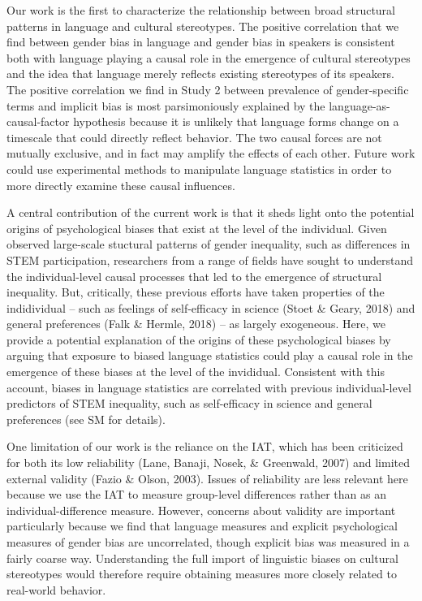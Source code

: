 \documentclass[man,floatsintext]{apa6}
\begin{document}
Our work is the first to characterize the relationship between broad structural patterns in language and cultural stereotypes. The positive correlation that we find between gender bias in language and gender bias in speakers is consistent both with language playing a causal role in the emergence of cultural stereotypes and the idea that language merely reflects existing stereotypes of its speakers. The positive correlation we find in Study 2 between prevalence of gender-specific terms and implicit bias is most parsimoniously explained by the language-as-causal-factor hypothesis because it is unlikely that language forms change on a timescale that could directly reflect behavior. The two causal forces are not mutually exclusive, and in fact may amplify the effects of each other. Future work could use experimental methods to manipulate language statistics in order to more directly examine these causal influences.

A central contribution of the current work is that it sheds light onto the potential origins of psychological biases that exist at the level of the individual. Given observed large-scale stuctural patterns of gender inequality, such as differences in STEM participation, researchers from a range of fields have sought to understand the individual-level causal processes that led to the emergence of structural inequality. But, critically, these previous efforts have taken properties of the indidividual -- such as feelings of self-efficacy in science (Stoet \& Geary, 2018) and general preferences (Falk \& Hermle, 2018) -- as largely exogeneous. Here, we provide a potential explanation of the origins of these psychological biases by arguing that exposure to biased language statistics could play a causal role in the emergence of these biases at the level of the invididual. Consistent with this account, biases in language statistics are correlated with previous individual-level predictors of STEM inequality, such as self-efficacy in science and general preferences (see SM for details).

One limitation of our work is the reliance on the IAT, which has been criticized for both its low reliability (Lane, Banaji, Nosek, \& Greenwald, 2007) and limited external validity (Fazio \& Olson, 2003). Issues of reliability are less relevant here because we use the IAT to measure group-level differences rather than as an individual-difference measure. However, concerns about validity are important particularly because we find that language measures and explicit psychological measures of gender bias are uncorrelated, though explicit bias was measured in a fairly coarse way. Understanding the full import of linguistic biases on cultural stereotypes would therefore require obtaining measures more closely related to real-world behavior.
\end{document}
